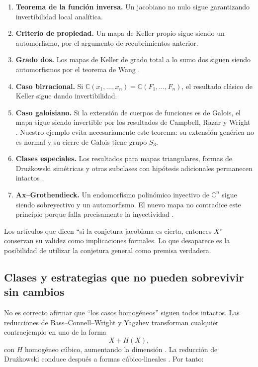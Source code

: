 \documentclass[11pt]{article}
\theoremstyle{definition}
\theoremstyle{remark}
\newcommand{\C}{\mathbb{C}}
\begin{document}
\begin{enumerate}
\item \textbf{Teorema de la funci\'on inversa.} Un jacobiano no nulo sigue
garantizando invertibilidad local anal\'itica.
\item \textbf{Criterio de propiedad.} Un mapa de Keller propio sigue siendo un
automorfismo, por el argumento de recubrimientos anterior.
\item \textbf{Grado dos.} Los mapas de Keller de grado total a lo sumo dos
siguen siendo automorfismos por el teorema de Wang \cite{Wang1980}.
\item \textbf{Caso birracional.} Si
$\C(x_1,\ldots,x_n)=\C(F_1,\ldots,F_n)$, el resultado cl\'asico de Keller sigue
dando invertibilidad.
\item \textbf{Caso galoisiano.} Si la extensi\'on de cuerpos de funciones es de
Galois, el mapa sigue siendo invertible por los resultados de Campbell, Razar
y Wright \cite{Campbell1973,Razar1979,Wright1981}. Nuestro ejemplo evita
necesariamente este teorema: su extensi\'on gen\'erica no es normal y su cierre
de Galois tiene grupo $S_3$.
\item \textbf{Clases especiales.} Los resultados para mapas triangulares,
formas de Dru\.zkowski sim\'etricas y otras subclases con hip\'otesis
adicionales permanecen intactos
\cite{DeBondtVanDenEssen2005,DruzkowskiSymmetric2005}.
\item \textbf{Ax--Grothendieck.} Un endomorfismo polin\'omico inyectivo de
$\C^n$ sigue siendo sobreyectivo y un automorfismo. El nuevo mapa no contradice
este principio porque falla precisamente la inyectividad \cite{Ax1968}.
\end{enumerate}

Los art\'iculos que dicen ``si la conjetura jacobiana es cierta, entonces
$X$'' conservan su validez como implicaciones formales. Lo que desaparece es
la posibilidad de utilizar la conjetura general como premisa verdadera.

\subsection{Clases y estrategias que no pueden sobrevivir sin cambios}

No es correcto afirmar que ``los casos homog\'eneos'' siguen todos intactos.
Las reducciones de Bass--Connell--Wright y Yagzhev transforman cualquier
contraejemplo en uno de la forma
\[
X+H(X),
\]
con $H$ homog\'eneo c\'ubico, aumentando la dimensi\'on
\cite{BassConnellWright1982}. La reducci\'on de Dru\.zkowski conduce despu\'es a
formas c\'ubico-lineales \cite{Druzkowski1983}. Por tanto:
\end{document}
